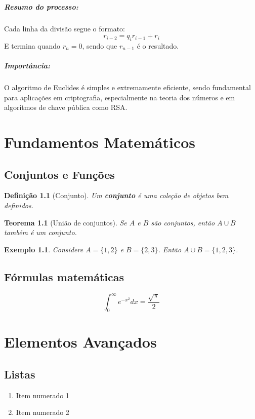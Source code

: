 \documentclass[12pt]{book}
\newtheorem{definition}{Definição}[chapter]
\newtheorem{theorem}{Teorema}[chapter]
\newtheorem{example}{Exemplo}[chapter]
\begin{document}
\paragraph{Resumo do processo:}
Cada linha da divisão segue o formato:
\[
  r_{i-2} = q_ir_{i-1} + r_i
\]
E termina quando $r_n = 0$, sendo que $r_{n-1}$ é o resultado.

\paragraph{Importância:} O algoritmo de Euclides é simples e extremamente eficiente, sendo fundamental para aplicações em criptografia, especialmente na teoria dos números e em algoritmos de chave pública como RSA.


\chapter{Fundamentos Matemáticos}
\section{Conjuntos e Funções}

\begin{definition}[Conjunto]
Um \textbf{conjunto} é uma coleção de objetos bem definidos.
\end{definition}

\begin{theorem}[União de conjuntos]
Se $A$ e $B$ são conjuntos, então $A \cup B$ também é um conjunto.
\end{theorem}

\begin{example}
Considere $A = \{1,2\}$ e $B = \{2,3\}$. Então $A \cup B = \{1,2,3\}$.
\end{example}

\section{Fórmulas matemáticas}
\begin{equation}
  \int_{0}^{\infty} e^{-x^2} dx = \frac{\sqrt{\pi}}{2}
\end{equation}

\chapter{Elementos Avançados}
\section{Listas}
\begin{enumerate}
    \item Item numerado 1
    \item Item numerado 2
\end{enumerate}
\end{document}

